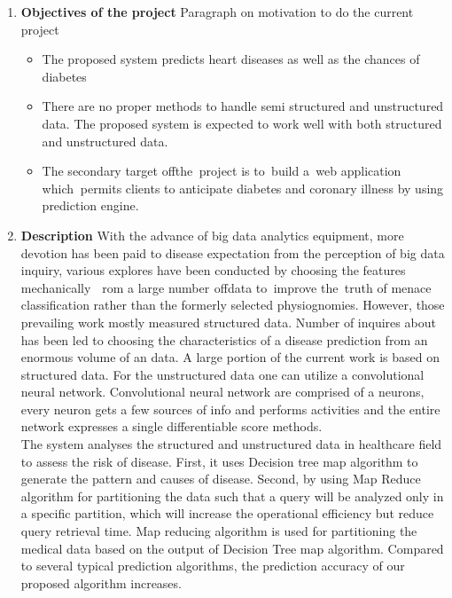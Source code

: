 \begin{abstracts}        
\normalsize{
\begin{enumerate}
\item \textbf{Objectives of the project} Paragraph on motivation to do the current project
	\begin{itemize}
		\item The proposed system predicts heart diseases as well as the chances of diabetes
		\item There are no proper methods to handle semi structured and unstructured data. The proposed system is expected to work well with both structured and unstructured data.
		\item The secondary target of\tiny\textcolor{white}{f}\normalsize   the\tiny\textcolor{white}{y}\normalsize project is to\tiny\textcolor{white}{o}\normalsize build a\tiny\textcolor{white}{n}\normalsize web application which\tiny\textcolor{white}{h}\normalsize permits clients to anticipate diabetes and coronary illness by using prediction engine.
\end{itemize}
\item \textbf{Description} With the advance of big data analytics equipment, more devotion has been paid to disease expectation from the perception of big data inquiry, various explores have been conducted by choosing the features mechanically \tiny\textcolor{white}{f}\normalsize from a large number\tiny\textcolor{white}{r}\normalsize of\tiny\textcolor{white}{f}\normalsize data to\tiny\textcolor{white}{o}\normalsize improve the\tiny\textcolor{white}{y}\normalsize truth of menace classification rather than the formerly selected physiognomies. However, those prevailing work mostly measured structured data. Number of inquires about has been led to choosing the characteristics of a disease prediction from an enormous volume of an data. A large portion of the current work is based on structured data. For the unstructured data one can utilize a convolutional neural network. Convolutional neural network are comprised of a neurons, every neuron gets a few sources of info and performs activities and the entire network expresses a single differentiable score methods.   \\
The system analyses the structured and unstructured data in healthcare field to assess the risk of disease. First, it uses Decision tree map algorithm to generate the pattern and causes of disease. Second, by using Map Reduce algorithm for partitioning the data such that a query will be analyzed only in a specific partition, which will increase the operational efficiency but reduce query retrieval time. Map reducing algorithm is used for partitioning the medical data based on the output of Decision Tree map algorithm. Compared to several typical prediction algorithms, the prediction accuracy of our proposed algorithm increases.

\end{enumerate}}
\end{abstracts}
